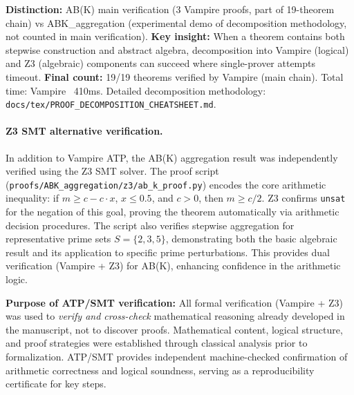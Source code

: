 \textbf{Distinction:} AB(K) main verification (3 Vampire proofs, part of 19-theorem chain) vs ABK\_aggregation (experimental demo of decomposition methodology, not counted in main verification). \textbf{Key insight:} When a theorem contains both stepwise construction and abstract algebra, decomposition into Vampire (logical) and Z3 (algebraic) components can succeed where single-prover attempts timeout. \textbf{Final count:} 19/19 theorems verified by Vampire (main chain). Total time: Vampire ~410ms. Detailed decomposition methodology: \texttt{docs/tex/PROOF\_DECOMPOSITION\_CHEATSHEET.md}.

\paragraph{Z3 SMT alternative verification.}
In addition to Vampire ATP, the AB(K) aggregation result was independently verified using the Z3 SMT solver. The proof script (\texttt{proofs/ABK\_aggregation/z3/ab\_k\_proof.py}) encodes the core arithmetic inequality: if $m\ge c - c\cdot x$, $x\le 0.5$, and $c>0$, then $m\ge c/2$. Z3 confirms \texttt{unsat} for the negation of this goal, proving the theorem automatically via arithmetic decision procedures. The script also verifies stepwise aggregation for representative prime sets $S=\{2,3,5\}$, demonstrating both the basic algebraic result and its application to specific prime perturbations. This provides dual verification (Vampire + Z3) for AB(K), enhancing confidence in the arithmetic logic.

\textbf{Purpose of ATP/SMT verification:} All formal verification (Vampire + Z3) was used to \emph{verify and cross-check} mathematical reasoning already developed in the manuscript, not to discover proofs. Mathematical content, logical structure, and proof strategies were established through classical analysis prior to formalization. ATP/SMT provides independent machine-checked confirmation of arithmetic correctness and logical soundness, serving as a reproducibility certificate for key steps.

